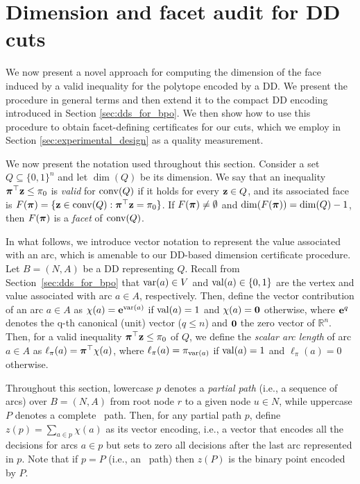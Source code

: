 \section{Dimension and facet audit for DD cuts} 
\label{sec:dimension_facet_audit}

We now present a novel approach for computing the dimension of the face induced by a valid inequality for the polytope encoded by a DD. We present the procedure in general terms and then extend it to the compact DD encoding introduced in Section \ref{sec:dds_for_bpo}. We then show how to use this procedure to obtain facet-defining certificates for our cuts, which we employ in Section \ref{sec:experimental_design} as a quality measurement.


We now present the notation used throughout this section. Consider a set $Q\subseteq\{0,1\}^n$ and let $\dim(Q)$ be its dimension. We say that an inequality $\bm{\pi}^\top \mathbf{z}\le \pi_0$ is \emph{valid} for $\operatorname{conv}(Q)$ if it holds for every $\mathbf{z}\in Q$, and its associated face is $F(\bm{\pi})=\{\mathbf{z}\in \operatorname{conv}(Q) : \bm{\pi}^\top \mathbf{z}=\pi_0\}$. If $F(\bm{\pi})\neq\emptyset$ and $\dim(F(\bm{\pi}))=\dim(Q)-1$, then $F(\bm{\pi})$ is a \emph{facet} of $\operatorname{conv}(Q)$.

In what follows, we introduce vector notation to represent the value associated with an arc, which is amenable to our DD-based dimension certificate procedure. Let $B=(N,A)$ be a DD representing $Q$. Recall from  Section~\ref{sec:dds_for_bpo} that  $\operatorname{var}(a) \in V$ and $\operatorname{val}(a)\in\{0,1\}$ are the vertex and value associated with arc $a \in A$, respectively. Then, define the vector contribution of an arc $a \in A$ as $\chi(a) = \mathbf{e}^{\operatorname{var}(a)}$ if $\operatorname{val}(a)=1$ and $\chi(a) = \mathbf{0}$ otherwise, where $\mathbf{e}^{q}$ denotes the q-th canonical (unit) vector ($q \leq n$) and $\mathbf{0}$ the zero vector of $\mathbb{R}^n$. Then, for a valid inequality $\bm{\pi}^\top \mathbf{z}\le \pi_0$ of $Q$, we define the \emph{scalar arc length} of arc $a \in A$ as $\ell_\pi(a)= \bm{\pi}^\top\chi(a)$, where  $\ell_\pi(a)= \pi_{\operatorname{var}(a)}$ if $\operatorname{val}(a)=1$ and  $\ell_\pi(a)= 0$ otherwise. 

Throughout this section, lowercase $p$ denotes a \emph{partial path} (i.e., a sequence of arcs) over $B=(N,A)$ from root node $r$ to a given node $u \in N$, while uppercase $P$ denotes a complete \rt\ path. Then, for any partial path $p$, define $z(p)=\sum_{a\in p}\chi(a)$ as its vector encoding, i.e., a vector that encodes all the decisions for arcs $a \in p$ but sets to zero all decisions after the last arc represented in $p$. Note that if $p = P$ (i.e.,  an \rt\ path) then $z(P)$ is the binary point encoded by $P$.

